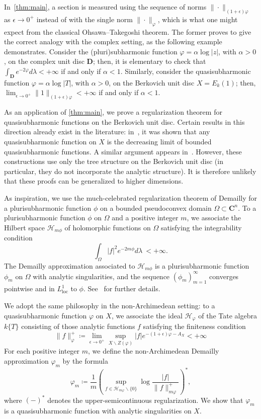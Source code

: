 \documentclass[10pt,reqno]{amsart}
\theoremstyle{plain}
\theoremstyle{definition}
\newcommand{\C}{\mathbf{C}}
\renewcommand{\H}{\mathcal{H}}
\numberwithin{equation}{section}
\begin{document}
In~\cref{thm:main}, a section is measured using the sequence of norms $\| \cdot \|_{(1+\epsilon)\varphi}$ as $\epsilon \to 0^+$ instead of with the single norm $\| \cdot \|_{\varphi}$, which is what one might expect from the classical Ohsawa--Takegoshi theorem. The former proves to give the correct analogy with the complex setting, as the following example demonstrates. Consider the (pluri)subharmonic function $\varphi = \alpha \log |z|$, with $\alpha > 0$, on the complex unit disc $\mathbf{D}$; then, it is elementary to check that $\int_{\mathbf{D}} e^{-2\varphi} d\lambda <+\infty$ if and only if $\alpha < 1$. Similarly, consider the quasisubharmonic function $\varphi = \alpha \log |T|$, with $\alpha > 0$, on the Berkovich unit disc $X = E_k(1)$; then, $\lim_{\epsilon \to 0^+} \| 1 \|_{(1+\epsilon)\varphi} < +\infty$ if and only if $\alpha < 1$.

As an application of \cref{thm:main}, we prove a regularization theorem for quasisubharmonic functions on the Berkovich unit disc. Certain results in this direction already exist in the literature: in~\cite[Theorem 2.10]{dynberko}, it was shown that any quasisubharmonic function on $X$ is the decreasing limit of bounded quasisubharmonic functions. A similar argument appears in~\cite[\S4.6]{favre06}. However, 
these constructions use
only the tree structure on the Berkovich unit disc (in particular, they do not incorporate the analytic structure). It is therefore unlikely that these proofs can be generalized to higher dimensions. 

As inspiration, we use the much-celebrated regularization theorem of Demailly for a plurisubharmonic function $\phi$ on a bounded pseudoconvex domain $\Omega \subset \C^n$. To a plurisubharmonic function $\phi$ on $\Omega$ and a positive integer $m$, we associate the Hilbert space $\mathscr{H}_{m\phi}$ of holomorphic functions on $\Omega$ satisfying the integrability condition 
$$\int_{\Omega} |f|^2 e^{-2m\phi} d\lambda\ < +\infty.$$
The Demailly approximation associated to $\mathscr{H}_{m\phi}$ is a plurisubharmonic function $\phi_m$ on $\Omega$ with analytic singularities, 
and the sequence $(\phi_m)_{m=1}^{\infty}$ converges pointwise and in $L^1_{\textrm{loc}}$ to $\phi$.
See~\cite{demailly92} for further details. 

We adopt the same philosophy in the non-Archimedean setting: to a quasisubharmonic function $\varphi$ on $X$, we associate the ideal $\H_{\varphi}$ of the Tate algebra $k\{ T \}$ consisting of those analytic functions $f$ satisfying the finiteness condition
$$
\| f \|^+_{\varphi} \coloneqq \lim_{\epsilon \to 0^+} \sup_{X \backslash Z(\varphi)} |f|e^{-(1+\epsilon)\varphi - A_X} < + \infty
$$
For each positive integer $m$, we define the non-Archimedean Demailly approximation $\varphi_m$ by the formula 
$$
\varphi_m \coloneqq \frac{1}{m} \left( \sup_{f \in \H_{m\varphi} \backslash \{ 0 \}} \log \frac{|f|}{\| f\|^+_{m\varphi}} \right)^*,
$$
where $( - )^*$ denotes the upper-semicontinuous regularization. We show that $\varphi_m$ is a quasisubharmonic function with analytic singularities on $X$. 
\end{document}
